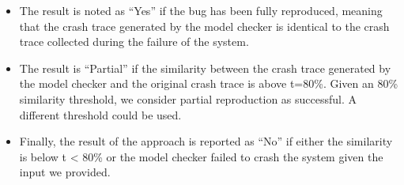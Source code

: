 \documentclass[times]{smrauth}
\begin{document}
\begin{itemize}
  \item The result is noted as ``Yes'' if the bug has been fully
reproduced, meaning that the crash trace generated by the
model checker is identical to the crash trace collected
during the failure of the system.
\item The result is ``Partial'' if the similarity between the crash
trace generated by the model checker and the original
crash trace is above t=80\%. Given an 80\% similarity
threshold, we consider partial reproduction as successful.
A different threshold could be used.
\item Finally, the result of the approach is reported as ``No'' if
either the similarity is below t < 80\% or the model
checker failed to crash the system given the input we
provided.
\end{itemize}
\end{document}
